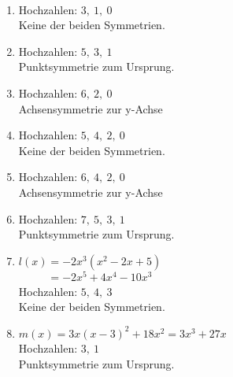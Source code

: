 \newpage
\begin{Answer}[ref=ganzSymA1]\\
	\begin{minipage}{\textwidth}
		\begin{minipage}[t]{0.49\textwidth}
			\begin{enumerate}[label=\alph*)]
				\item Hochzahlen: \(3,\ 1,\ 0\)\\
				Keine der beiden Symmetrien.
				\item Hochzahlen: \(5,\ 3,\ 1\)\\
				Punktsymmetrie zum Ursprung.
				\item Hochzahlen: \(6,\ 2,\ 0\)\\
				Achsensymmetrie zur y-Achse
				\item Hochzahlen: \(5,\ 4,\ 2,\ 0\)\\
				Keine der beiden Symmetrien.
			\end{enumerate}
		\end{minipage}
		\begin{minipage}[t]{0.49\textwidth}
			\begin{enumerate}[label=\alph*)]
				\setcounter{enumi}{4}
				\item Hochzahlen: \(6,\ 4,\ 2,\ 0\)\\
				Achsensymmetrie zur y-Achse
				\item Hochzahlen: \(7,\ 5,\ 3,\ 1\)\\
				Punktsymmetrie zum Ursprung.
				\item \(l(x)=-2x^3\left(x^2-2x+5\right)\)\\
				\(\phantom{l(x)}=-2x^5+4x^4-10x^3\)\\
				Hochzahlen: \(5,\ 4,\ 3\)\\
				Keine der beiden Symmetrien.
				\item \(m(x)=3x\left(x-3\right)^2+18x^2=3x^3+27x\)\\
				Hochzahlen: \(3,\ 1\)\\
				Punktsymmetrie zum Ursprung.
			\end{enumerate}
		\end{minipage}
	\end{minipage}
\end{Answer}